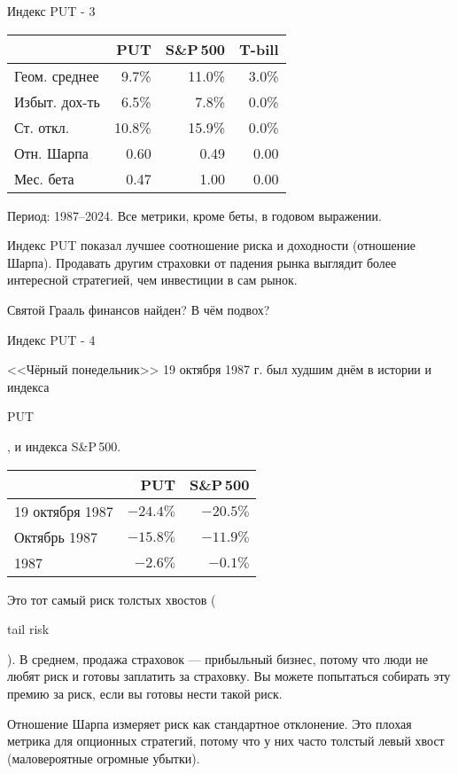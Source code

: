 \documentclass{beamer}
\newcommand{\en}[1]{\begin{otherlanguage}{english}#1\end{otherlanguage}}
\begin{document}
\begin{frame}{Индекс PUT - 3}
\centering
\begin{tabular}{l|r|r|r}
& PUT & S\&P\,500 & T-bill \\ \hline
Геом. среднее & 9.7\% & 11.0\% & 3.0\% \\
Избыт. дох-ть & 6.5\% & 7.8\% & 0.0\% \\
Ст. откл. & 10.8\% & 15.9\% & 0.0\% \\
Отн. Шарпа & 0.60 & 0.49 & 0.00 \\
Мес. бета & 0.47 & 1.00 & 0.00
\end{tabular}

\small Период: 1987--2024. Все метрики, кроме беты, в годовом выражении.

\justify
Индекс PUT показал лучшее соотношение риска и доходности (отношение Шарпа). Продавать другим страховки от падения рынка выглядит более интересной стратегией, чем инвестиции в сам рынок.

\justify
Святой Грааль финансов найден? В чём подвох?
\end{frame}



\begin{frame}{Индекс PUT - 4}

\justify
<<Чёрный понедельник>> 19 октября 1987 г. был худшим днём в истории и индекса \en{PUT}, и индекса S\&P\,500.

\centering
\begin{tabular}{l|r|r}
& PUT & S\&P\,500 \\ \hline
19 октября 1987 & $-24.4\%$ & $-20.5\%$ \\
Октябрь 1987 & $-15.8\%$ & $-11.9\%$ \\
1987 & $-2.6\%$ & $-0.1\%$ 
\end{tabular}

\justify
Это тот самый риск толстых хвостов (\en{tail risk}). В среднем, продажа страховок --- прибыльный бизнес, потому что люди не любят риск и готовы заплатить за страховку. Вы можете попытаться собирать эту премию за риск, если вы готовы нести такой риск.

\justify
Отношение Шарпа измеряет риск как стандартное отклонение. Это плохая метрика для опционных стратегий, потому что у них часто толстый левый хвост (маловероятные огромные убытки).
\end{frame}



\newcommand{\drawStockNode}[5]{

	\node (#5)
	[
		draw,
		rectangle,
		rounded corners,
		inner sep = 0pt,
		outer sep = 0pt,
		minimum width = 2.4cm,
		minimum height = 0.55cm,
		align = center
	]
	at (#3, #4)
	{
		\begin{tabular}{c|c}
		#1 & #2
		\end{tabular}
	};
}
\end{document}
